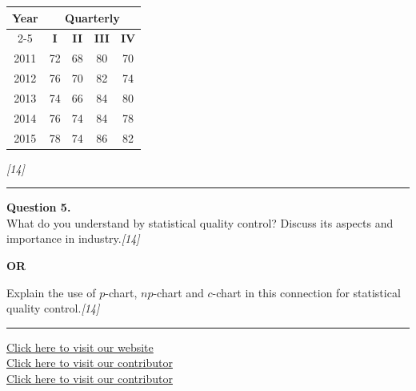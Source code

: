 \documentclass[11pt,a4paper]{article}
\newcommand{\pts}[1]{\hfill   \textit{[#1]}}
\begin{document}
\begin{center}
\small

\begin{tabular}{|c|c|c|c|c|}
\hline
   \textbf{Year} & \multicolumn{4}{c|}{   \textbf{Quarterly}} \\
\cline{2-5}
&   \textbf{I} &   \textbf{II} &   \textbf{III} &   \textbf{IV} \\
\hline
2011 & 72 & 68 & 80 & 70 \\
2012 & 76 & 70 & 82 & 74 \\
2013 & 74 & 66 & 84 & 80 \\
2014 & 76 & 74 & 84 & 78 \\
2015 & 78 & 74 & 86 & 82 \\
\hline
\end{tabular}
\end{center}\pts{14}

\medskip\rule{\linewidth}{0.2pt}

\pagebreak




\noindent   \textbf{Question 5.} \\
What do you understand by statistical quality control? Discuss its aspects and importance in industry.\pts{14}

\centerline{   \textbf{OR}}

Explain the use of $p$-chart, $np$-chart and $c$-chart in this connection for statistical quality control.\pts{14}

\vfill
\rule{\linewidth}{0.4pt}

\begin{center}\small
\href{https://bhu-exam.vercel.app/}{Click here to visit our website}\\[4pt]
\href{https://me-aryan.vercel.app/}{Click here to visit our contributor}\\[4pt]
\href{https://quashan-me.vercel.app/}{Click here to visit our contributor}
\end{center}
\end{document}
